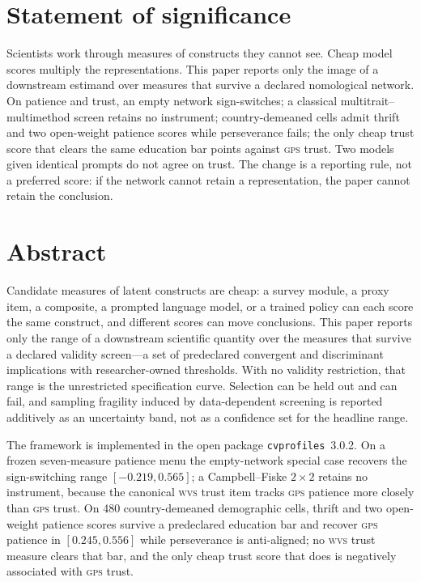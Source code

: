 \documentclass[10pt,letterpaper]{article}
\newcommand{\GPS}{\textsc{gps}}
\newcommand{\WVS}{\textsc{wvs}}
\newcommand{\cvp}{\texttt{cvprofiles}}
\begin{document}
\vspace{0.85em}

\section*{Statement of significance}
Scientists work through measures of constructs they cannot see.
Cheap model scores multiply the representations.
This paper reports only the image of a downstream estimand over measures that survive a declared nomological network.
On patience and trust, an empty network sign-switches; a classical multitrait--multimethod screen retains no instrument; country-demeaned cells admit thrift and two open-weight patience scores while perseverance fails; the only cheap trust score that clears the same education bar points against \GPS{} trust.
Two models given identical prompts do not agree on trust.
The change is a reporting rule, not a preferred score: if the network cannot retain a representation, the paper cannot retain the conclusion.

\section*{Abstract}
Candidate measures of latent constructs are cheap: a survey module, a proxy item, a composite, a prompted language model, or a trained policy can each score the same construct, and different scores can move conclusions.
This paper reports only the range of a downstream scientific quantity over the measures that survive a declared validity screen---a set of predeclared convergent and discriminant implications with researcher-owned thresholds.
With no validity restriction, that range is the unrestricted specification curve.
Selection can be held out and can fail, and sampling fragility induced by data-dependent screening is reported additively as an uncertainty band, not as a confidence set for the headline range.

The framework is implemented in the open package \cvp{}~3.0.2.
On a frozen seven-measure patience menu the empty-network special case recovers the sign-switching range $[-0.219,0.565]$; a Campbell--Fiske $2\times 2$ retains no instrument, because the canonical \WVS{} trust item tracks \GPS{} patience more closely than \GPS{} trust.
On 480 country-demeaned demographic cells, thrift and two open-weight patience scores survive a predeclared education bar and recover \GPS{} patience in $[0.245,0.556]$ while perseverance is anti-aligned; no \WVS{} trust measure clears that bar, and the only cheap trust score that does is negatively associated with \GPS{} trust.
\end{document}

